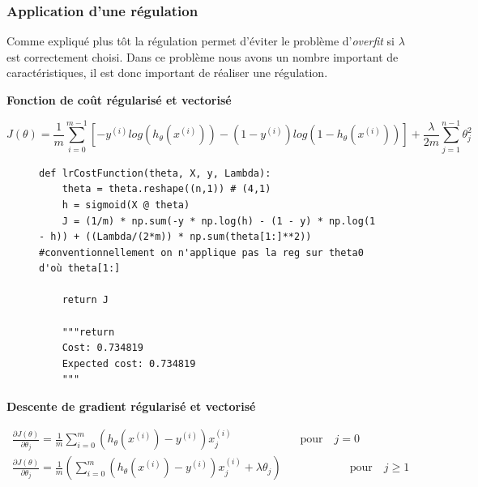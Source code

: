 \subsubsection{Application d'une régulation}

Comme expliqué plus tôt la régulation permet d'éviter le problème d'\textit{overfit} si $\lambda$ est correctement choisi. Dans ce problème nous avons un nombre important de caractéristiques, il est
donc important de réaliser une régulation.

\vspace{0.4cm}
\noindent
\textbf{Fonction de coût régularisé et vectorisé}

\begin{equation}\label{eq:cout-reg}
    J(\theta) = \frac{1}{m} \sum_{i=0}^{m-1}[-y^{(i)} log(h_\theta(x^{(i)})) - (1-y^{(i)}) log(1-h_\theta(x^{(i)}))] + \frac{\lambda}{2m} \sum_{j=1}^{n-1} \theta_j^2
\end{equation}

\begin{figure}[!h]
\begin{verbatim}
def lrCostFunction(theta, X, y, Lambda):
    theta = theta.reshape((n,1)) # (4,1)
    h = sigmoid(X @ theta)
    J = (1/m) * np.sum(-y * np.log(h) - (1 - y) * np.log(1 - h)) + ((Lambda/(2*m)) * np.sum(theta[1:]**2)) #conventionnellement on n'applique pas la reg sur theta0 d'où theta[1:]
        
    return J

    """return 
    Cost: 0.734819
    Expected cost: 0.734819
    """
\end{verbatim}   
\end{figure}


\vspace{0.4cm}
\noindent
\textbf{Descente de gradient régularisé et vectorisé}

\begin{align}\label{eq:descente-gradient-reg}
    \frac{\partial J(\theta)}{\partial \theta_j} = \frac{1}{m} \sum_{i=0}^{m} (h_\theta(x^{(i)}) - y^{(i)}) x_j^{(i)} \qquad \qquad \qquad \text{pour} \quad j=0 \\
    \frac{\partial J(\theta)}{\partial \theta_j} = \frac{1}{m} \left( \sum_{i=0}^{m} (h_\theta(x^{(i)}) - y^{(i)}) x_j^{(i)} + \lambda \theta_j \right) \qquad \qquad \qquad \text{pour} \quad j\geq1 
\end{align}

